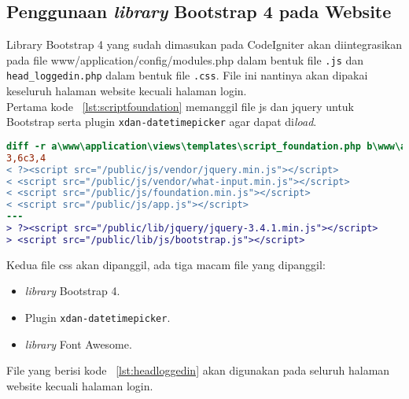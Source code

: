 \subsection{Penggunaan \textit{library} Bootstrap 4 pada Website}

Library Bootstrap 4 yang sudah dimasukan pada CodeIgniter akan diintegrasikan pada file www/application/config/modules.php dalam bentuk file \texttt{.js} dan \texttt{head\_loggedin.php} dalam bentuk file \texttt{.css}. File ini nantinya akan dipakai keseluruh halaman website kecuali halaman login.\\

Pertama kode ~\ref{lst:scriptfoundation} memanggil file js dan jquery untuk Bootstrap serta plugin \texttt{xdan-datetimepicker} agar dapat di\textit{load}. \\

\begin{lstlisting}[language=diff, caption=Penambahan \path{\views\templates\script_foundation.php},  basicstyle=\ttfamily, frame=single,
columns=fullflexible, keepspaces=true, breaklines=true, label={lst:scriptfoundation}]
diff -r a\www\application\views\templates\script_foundation.php b\www\application\views\templates\script_foundation.php
3,6c3,4
< ?><script src="/public/js/vendor/jquery.min.js"></script>
< <script src="/public/js/vendor/what-input.min.js"></script>
< <script src="/public/js/foundation.min.js"></script>
< <script src="/public/js/app.js"></script>
---
> ?><script src="/public/lib/jquery/jquery-3.4.1.min.js"></script>
> <script src="/public/lib/js/bootstrap.js"></script>

\end{lstlisting}

Kedua file css akan dipanggil, ada tiga macam file yang dipanggil: 
\begin{itemize}
	\item \textit{library} Bootstrap 4.
	\item Plugin \texttt{xdan-datetimepicker}.
	\item \textit{library} Font Awesome.
\end{itemize}
File yang berisi kode ~\ref{lst:headloggedin} akan digunakan pada seluruh halaman website kecuali halaman login.
 
